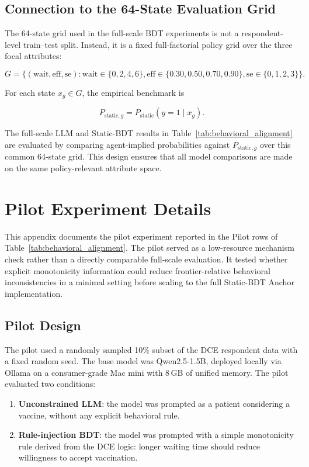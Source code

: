 \documentclass[11pt]{article}
\begin{document}
\subsection{Connection to the 64-State Evaluation Grid}

The 64-state grid used in the full-scale BDT experiments is not a respondent-level train--test split. Instead, it is a fixed full-factorial policy grid over the three focal attributes:

\[
G
=
\{(\text{wait}, \text{eff}, \text{se}) :
\text{wait} \in \{0,2,4,6\},
\text{eff} \in \{0.30,0.50,0.70,0.90\},
\text{se} \in \{0,1,2,3\}
\}.
\]

For each state \(x_g \in G\), the empirical benchmark is

\[
P_{\text{static},g}
=
P_{\text{static}}(y=1 \mid x_g).
\]

The full-scale LLM and Static-BDT results in Table~\ref{tab:behavioral_alignment} are evaluated by comparing agent-implied probabilities against \(P_{\text{static},g}\) over this common 64-state grid. This design ensures that all model comparisons are made on the same policy-relevant attribute space.



\section{Pilot Experiment Details}
\label{app:pilot}

This appendix documents the pilot experiment reported in the Pilot rows of Table~\ref{tab:behavioral_alignment}. The pilot served as a low-resource mechanism check rather than a directly comparable full-scale evaluation. It tested whether explicit monotonicity information could reduce frontier-relative behavioral inconsistencies in a minimal setting before scaling to the full Static-BDT Anchor implementation.

\subsection{Pilot Design}

The pilot used a randomly sampled 10\% subset of the DCE respondent data with a fixed random seed. The base model was Qwen2.5-1.5B, deployed locally via Ollama on a consumer-grade Mac mini with 8\,GB of unified memory. The pilot evaluated two conditions:

\begin{enumerate}
    \item \textbf{Unconstrained LLM}: the model was prompted as a patient considering a vaccine, without any explicit behavioral rule.
    \item \textbf{Rule-injection BDT}: the model was prompted with a simple monotonicity rule derived from the DCE logic: longer waiting time should reduce willingness to accept vaccination.
\end{enumerate}
\end{document}
